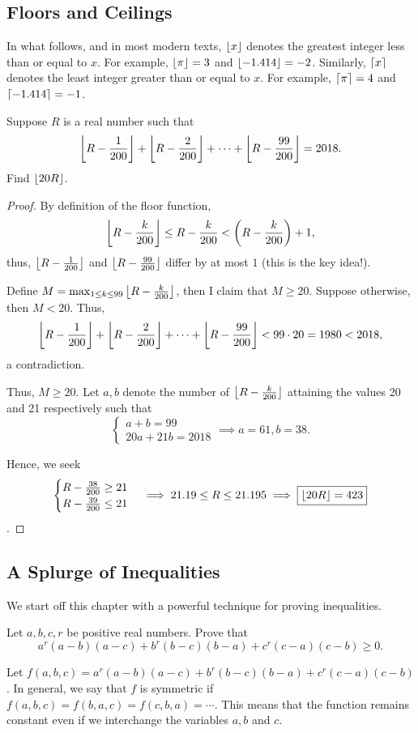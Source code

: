 \documentclass[../jarvis.tex]{subfiles}
\begin{document}
\subsection{Floors and Ceilings}
In what follows, and in most modern texts, $\left\lfloor x \right\rfloor$ denotes the greatest integer less than or equal to $x$. For example, $\left\lfloor \pi \right\rfloor=3$ and $\left\lfloor -1.414 \right\rfloor=-2$. 
Similarly, $\left\lceil x \right\rceil$ denotes the least integer greater than or equal to $x$. For example, $\left\lceil \pi \right\rceil=4$ and $\left\lceil -1.414 \right\rceil=-1$.
\begin{example}[2018 SMO(S) P25]
    Suppose $R$ is a real number such that
    $$\left\lfloor R-\frac{1}{200} \right\rfloor+\left\lfloor R-\frac{2}{200} \right\rfloor+\cdots+\left\lfloor R-\frac{99}{200} \right\rfloor=2018.$$
    Find $\left\lfloor 20R \right\rfloor$.
\end{example}
\begin{proof}
    By definition of the floor function,
    $$\left\lfloor R-\frac{k}{200} \right\rfloor\leq R-\frac{k}{200} < \left(R-\frac{k}{200}\right)+1,$$ 
    thus, $\left\lfloor R-\frac{1}{200} \right\rfloor$ and $\left\lfloor R-\frac{99}{200} \right\rfloor$ differ by at most $1$ (this is the key idea!). 
    
    Define $M=\max_{1\leq k\leq 99}\left\lfloor R-\frac{k}{200} \right\rfloor$, then I claim that $M\geq 20$. Suppose otherwise, then $M < 20$. Thus, 
    $$\left\lfloor R-\frac{1}{200} \right\rfloor+\left\lfloor R-\frac{2}{200} \right\rfloor+\cdots+\left\lfloor R-\frac{99}{200} \right\rfloor < 99\cdot 20 = 1980 < 2018,$$
    a contradiction.

    Thus, $M \geq 20$. Let $a, b$ denote the number of $\left\lfloor R-\frac{k}{200} \right\rfloor$ attaining the values 20 and 21 respectively such that
    $$\begin{cases}
        a+b=99 \\
        20a+21b=2018
    \end{cases}
    \implies a=61, b=38.$$

    Hence, we seek 
    $$\begin{cases}
        R-\frac{38}{200} \geq 21 \\
        R-\frac{39}{200}\leq 21
    \end{cases}
    \implies 21.19 \leq R \leq 21.195 \implies \boxed{\left\lfloor 20R \right\rfloor=423}$$.
\end{proof}

\subsection{A Splurge of Inequalities}
We start off this chapter with a powerful technique for proving inequalities.
\begin{example}\label{algebra-schur}
Let $a,b,c,r$ be positive real numbers. Prove that
$$a^r(a-b)(a-c)+b^r(b-c)(b-a)+c^r(c-a)(c-b)\geq 0.$$
\end{example}
Let $f(a,b,c)=a^r(a-b)(a-c)+b^r(b-c)(b-a)+c^r(c-a)(c-b)$. In general, we say that $f$ is symmetric if $f(a,b,c)=f(b,a,c)=f(c,b,a)=\cdots$. This means that the function remains constant even if we interchange the variables $a,b$ and $c$.
\end{document}
